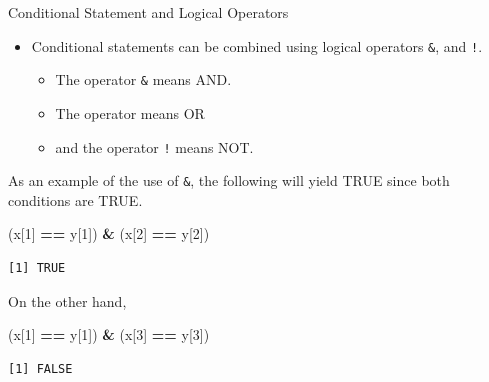 \documentclass[
  ignorenonframetext,
]{beamer}
\newenvironment{Shaded}{\begin{snugshade}}{\end{snugshade}}
\newcommand{\DecValTok}[1]{\textcolor[rgb]{0.00,0.00,0.81}{#1}}
\newcommand{\NormalTok}[1]{#1}
\newcommand{\SpecialCharTok}[1]{\textcolor[rgb]{0.81,0.36,0.00}{\textbf{#1}}}
\providecommand{\tightlist}{%
  \setlength{\itemsep}{0pt}\setlength{\parskip}{0pt}}
\begin{document}
\begin{frame}[fragile]{Conditional Statement and Logical Operators}
\label{conditional-statement-and-logical-operators}
\begin{itemize}
\item
  Conditional statements can be combined using logical operators
  \texttt{\&}, \texttt{\textbar{}} and \texttt{!}.

  \begin{itemize}
  \tightlist
  \item
    The operator \texttt{\&} means AND.
  \item
    The operator \texttt{\textbar{}} means OR
  \item
    and the operator \texttt{!} means NOT.
  \end{itemize}
\end{itemize}

As an example of the use of \texttt{\&}, the following will yield TRUE
since both conditions are TRUE.

\small

\begin{Shaded}
\begin{Highlighting}[]
\NormalTok{(x[}\DecValTok{1}\NormalTok{] }\SpecialCharTok{==}\NormalTok{ y[}\DecValTok{1}\NormalTok{]) }\SpecialCharTok{\&}\NormalTok{ (x[}\DecValTok{2}\NormalTok{] }\SpecialCharTok{==}\NormalTok{ y[}\DecValTok{2}\NormalTok{])}
\end{Highlighting}
\end{Shaded}

\begin{verbatim}
[1] TRUE
\end{verbatim}

\normalsize

On the other hand, \small

\begin{Shaded}
\begin{Highlighting}[]
\NormalTok{(x[}\DecValTok{1}\NormalTok{] }\SpecialCharTok{==}\NormalTok{ y[}\DecValTok{1}\NormalTok{]) }\SpecialCharTok{\&}\NormalTok{ (x[}\DecValTok{3}\NormalTok{] }\SpecialCharTok{==}\NormalTok{ y[}\DecValTok{3}\NormalTok{])}
\end{Highlighting}
\end{Shaded}

\begin{verbatim}
[1] FALSE
\end{verbatim}

\normalsize
\end{frame}
\end{document}
